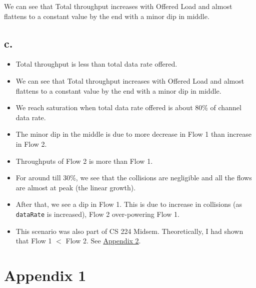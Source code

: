 \documentclass[11pt, fleqn]{article}
\begin{document}
We can see that Total throughput increases with Offered Load and almost flattens to a constant value by the end with a minor dip in middle. \\

\subsection*{c.}

\begin{itemize}
    \item Total throughput is less than total data rate offered.
    \item We can see that Total throughput increases with Offered Load and almost flattens to a constant value by the end with a minor dip in middle.
    \item We reach saturation when total data rate offered is about 80\% of channel data rate.
    \item The minor dip in the middle is due to more decrease in Flow 1 than increase in Flow 2.
    \item Throughputs of Flow 2 is more than Flow 1.
    \item For around till 30\%, we see that the collisions are negligible and all the flows are almost at peak (the linear growth).
    \item After that, we see a dip in Flow 1. This is due to increase in collisions (as \texttt{dataRate} is increased), Flow 2 over-powering Flow 1.
    \item This scenario was also part of CS 224 Midsem. Theoretically, I had shown that Flow 1 $<$ Flow 2.
    See \hyperref[Appendix 2]{Appendix 2}.
\end{itemize}

\newpage
\section*{Appendix 1}
\label{Appendix 1}
\end{document}
